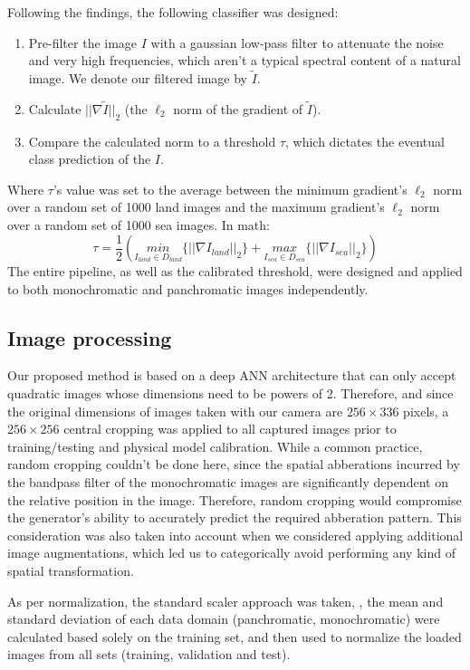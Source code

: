 Following the findings, the following classifier was designed:
\begin{enumerate}
    \item Pre-filter the image $I$ with a gaussian low-pass filter to attenuate the noise and very high frequencies, which aren't a typical spectral content of a natural image. 
    We denote our filtered image by $\tilde{I}$.
    \item Calculate $||\nabla \tilde{I}||_2$ (the $\ell_2$ norm of the gradient of $\tilde{I}$).
    \item Compare the calculated norm to a threshold $\tau$, which dictates the eventual class prediction of the $I$.
\end{enumerate}
Where $\tau$'s value was set to the average between the minimum gradient's $\ell_2$ norm over a random set of 1000 land images and the maximum gradient's $\ell_2$ norm over a random set of 1000 sea images.
In math:
\begin{equation}
    \tau = \frac{1}{2} \left( \underset{I_\mathit{land} \in D_\mathit{land}}{min} \{||\nabla I_\mathit{land}||_2\} 
    + \underset{I_\mathit{sea} \in D_\mathit{sea}}{max} \{||\nabla I_\mathit{sea}||_2\} \right)
\end{equation}
The entire pipeline, as well as the calibrated threshold, were designed and applied to both monochromatic and panchromatic images independently.

\subsection{Image processing}
Our proposed method is based on a deep ANN architecture that can only accept quadratic images whose dimensions need to be powers of 2.
Therefore, and since the original dimensions of images taken with our camera are $256 \times 336$ pixels, a $256 \times 256$ central cropping was applied to all captured images prior to training/testing and physical model calibration.
While a common practice, random cropping couldn't be done here, since the spatial abberations incurred by the bandpass filter of the monochromatic images are significantly dependent on the relative position in the image. 
Therefore, random cropping would compromise the generator's ability to accurately predict the required abberation pattern.
This consideration was also taken into account when we considered applying additional image augmentations, which led us to categorically avoid performing any kind of spatial transformation.

As per normalization, the standard scaler approach was taken, \ie, the mean and standard deviation of each data domain (panchromatic, monochromatic) were calculated based solely on the training set, and then used to normalize the loaded images from all sets (training, validation and test).
